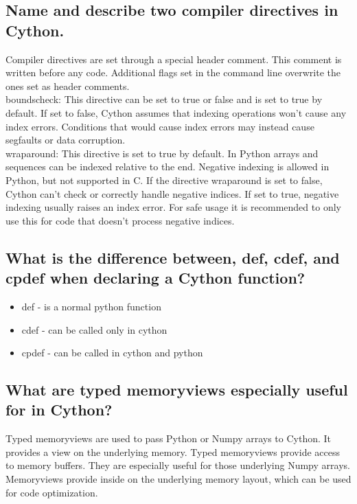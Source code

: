 \documentclass[runningheads]{llncs}
\begin{document}
\subsection{Name and describe two compiler directives in Cython.}
Compiler directives are set through a special header comment.
This comment is written before any code.
Additional flags set in the command line overwrite the ones set as header comments.
\\
boundscheck: This directive can be set to true or false and is set to true by default.
If set to false, Cython assumes that indexing operations won't cause any index errors.
Conditions that would cause index errors may instead cause segfaults or data corruption.
\\
wraparound: This directive is set to true by default. 
In Python arrays and sequences can be indexed relative to the end.
Negative indexing is allowed in Python, but not supported in C.
If the directive wraparound is set to false, Cython can't check or correctly handle negative indices.
If set to true, negative indexing usually raises an index error.
For safe usage it is recommended to only use this for code that doesn't process negative indices.


\subsection{What is the difference between, def, cdef, and cpdef when declaring a Cython function?}
\begin{itemize}
	\item def - is a normal python function
	\item cdef - can be called only in cython
	\item cpdef - can be called in cython and python
\end{itemize}

\subsection{What are typed memoryviews especially useful for in Cython?}
Typed memoryviews are used to pass Python or Numpy arrays to Cython.
It provides a view on the underlying memory.
Typed memoryviews provide access to memory buffers. 
They are especially useful for those underlying Numpy arrays.
Memoryviews provide inside on the underlying memory layout, which can be used for code optimization.
\end{document}
